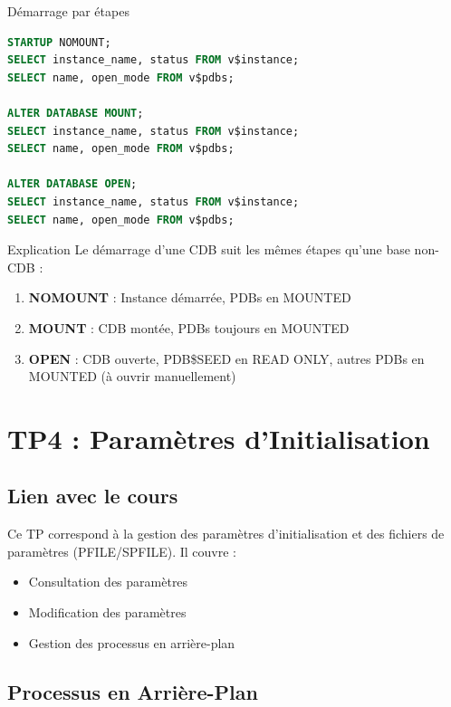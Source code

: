 \documentclass[12pt,a4paper]{article}
\begin{document}
\begin{commande}{Démarrage par étapes}
\begin{lstlisting}[language=SQL]
STARTUP NOMOUNT;
SELECT instance_name, status FROM v$instance;
SELECT name, open_mode FROM v$pdbs;

ALTER DATABASE MOUNT;
SELECT instance_name, status FROM v$instance;
SELECT name, open_mode FROM v$pdbs;

ALTER DATABASE OPEN;
SELECT instance_name, status FROM v$instance;
SELECT name, open_mode FROM v$pdbs;
\end{lstlisting}
\end{commande}

\begin{explication}{Explication}
Le démarrage d'une CDB suit les mêmes étapes qu'une base non-CDB :
\begin{enumerate}
    \item \textbf{NOMOUNT} : Instance démarrée, PDBs en MOUNTED
    \item \textbf{MOUNT} : CDB montée, PDBs toujours en MOUNTED
    \item \textbf{OPEN} : CDB ouverte, PDB\$SEED en READ ONLY, autres PDBs en MOUNTED (à ouvrir manuellement)
\end{enumerate}
\end{explication}

\section{TP4 : Paramètres d'Initialisation}

\subsection{Lien avec le cours}

Ce TP correspond à la gestion des paramètres d'initialisation et des fichiers de paramètres (PFILE/SPFILE). Il couvre :
\begin{itemize}
    \item Consultation des paramètres
    \item Modification des paramètres
    \item Gestion des processus en arrière-plan
\end{itemize}

\subsection{Processus en Arrière-Plan}
\end{document}
